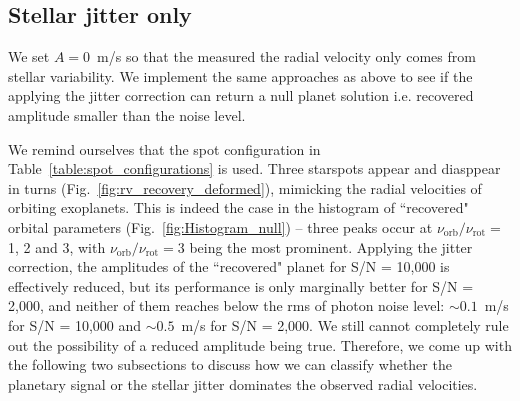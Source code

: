 \subsection{Stellar jitter only}

We set $A=0$~m/s so that the measured the radial velocity only comes from stellar variability. We implement the same approaches as above to see if the applying the jitter correction can return a null planet solution i.e. recovered amplitude smaller than the noise level.

We remind ourselves that the spot configuration in Table~\ref{table:spot_configurations} is used. Three starspots appear and diasppear in turns (Fig.~\ref{fig:rv_recovery_deformed}), mimicking the radial velocities of orbiting exoplanets. This is indeed the case in the histogram of ``recovered" orbital parameters (Fig.~\ref{fig:Histogram_null}) -- three peaks occur at $\nu_\text{orb}/\nu_\text{rot} =$ 1, 2 and 3, with $\nu_\text{orb}/\nu_\text{rot} = 3$ being the most prominent. Applying the jitter correction, the amplitudes of the ``recovered" planet for S/N = 10,000 is effectively reduced, but its performance is only marginally better for S/N = 2,000, and neither of them reaches below the rms of photon noise level: $\sim 0.1$~m/s for S/N = 10,000 and $\sim 0.5$~m/s for S/N = 2,000. We still cannot completely rule out the possibility of a reduced amplitude being true. Therefore, we come up with the following two subsections to discuss how we can classify whether the planetary signal or the stellar jitter dominates the observed radial velocities. 


